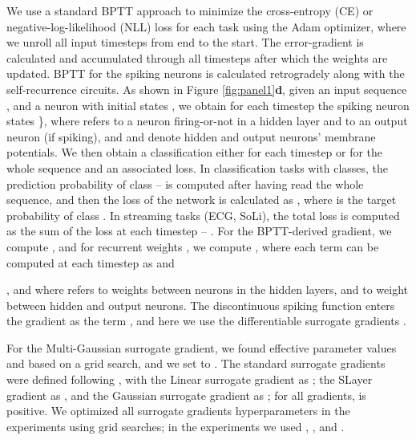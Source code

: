 \documentclass[fleqn,10pt]{wlscirep}
\begin{document}
We use a standard BPTT approach \cite{bellec2020solution} to minimize the cross-entropy (CE) or negative-log-likelihood (NLL) loss for each task using the Adam\cite{kingma2014adam} optimizer, where we unroll all input timesteps from end to the start. The error-gradient is calculated and accumulated through all timesteps after which the weights are updated. BPTT for the spiking neurons is calculated retrogradely along with the self-recurrence circuits. As shown in Figure \ref{fig:panel1}\textbf{d}, given an input sequence , and a neuron with initial states , we obtain for each timestep  the spiking neuron states \}, where  refers to a neuron firing-or-not in a hidden layer and  to an output neuron (if spiking), and  and  denote hidden and output neurons' membrane potentials. We then obtain a classification  either for each timestep or for the whole sequence  and an associated loss. In classification tasks with  classes, the prediction probability of class  --   is computed after having read the whole sequence, and  then the loss of the network is calculated as , where  is the target probability of class . In streaming tasks (ECG, SoLi), the total loss is computed as the sum of the loss at each timestep -- . For the BPTT-derived gradient, we compute
,
and for recurrent weights , we compute , where each term can be computed at each timestep  as  and 


  , and where  refers to weights between neurons in the hidden layers, and  to weight between hidden and output neurons.
The discontinuous spiking function enters the gradient as the term , and here we use the differentiable surrogate gradients \cite{neftci2019surrogate}.  

For the Multi-Gaussian surrogate gradient, we found effective parameter values  and  based on a grid search, and we set  to . The standard surrogate gradients were defined following \cite{neftci2019surrogate}, with the Linear surrogate gradient as ; the SLayer\cite{shrestha2018slayer}  gradient  as , and the Gaussian surrogate gradient as ; for all gradients,  is positive. We optimized all surrogate gradients hyperparameters in the experiments using grid searches; in the experiments we used  , , and . 
\end{document}
